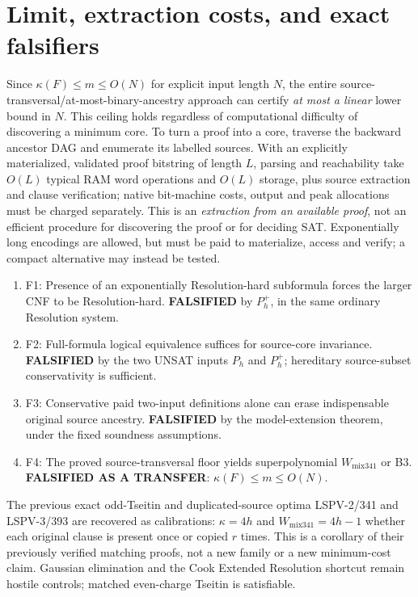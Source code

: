 \documentclass[11pt]{article}
\begin{document}
\section*{Limit, extraction costs, and exact falsifiers}
Since $\kappa(F)\le m\le O(N)$ for explicit input length $N$, the entire source-transversal/at-most-binary-ancestry approach can certify \emph{at most a linear} lower bound in $N$. This ceiling holds regardless of computational difficulty of discovering a minimum core. To turn a proof into a core, traverse the backward ancestor DAG and enumerate its labelled sources. With an explicitly materialized, validated proof bitstring of length $L$, parsing and reachability take $O(L)$ typical RAM word operations and $O(L)$ storage, plus source extraction and clause verification; native bit-machine costs, output and peak allocations must be charged separately. This is an \emph{extraction from an available proof}, not an efficient procedure for discovering the proof or for deciding SAT. Exponentially long encodings are allowed, but must be paid to materialize, access and verify; a compact alternative may instead be tested.

\begin{enumerate}
\item[] F1: Presence of an exponentially Resolution-hard subformula forces the larger CNF to be Resolution-hard. \textbf{FALSIFIED} by $P_h^+$, in the same ordinary Resolution system.
\item[] F2: Full-formula logical equivalence suffices for source-core invariance. \textbf{FALSIFIED} by the two UNSAT inputs $P_h$ and $P_h^+$; hereditary source-subset conservativity is sufficient.
\item[] F3: Conservative paid two-input definitions alone can erase indispensable original source ancestry. \textbf{FALSIFIED} by the model-extension theorem, under the fixed soundness assumptions.
\item[] F4: The proved source-transversal floor yields superpolynomial $W_{\mathrm{mix341}}$ or B3. \textbf{FALSIFIED AS A TRANSFER}: $\kappa(F)\le m\le O(N)$.
\end{enumerate}
The previous exact odd-Tseitin and duplicated-source optima LSPV-2/341 and LSPV-3/393 are recovered as calibrations: $\kappa=4h$ and $W_{\mathrm{mix341}}=4h-1$ whether each original clause is present once or copied $r$ times. This is a corollary of their previously verified matching proofs, not a new family or a new minimum-cost claim. Gaussian elimination and the Cook Extended Resolution shortcut remain hostile controls; matched even-charge Tseitin is satisfiable.
\end{document}

